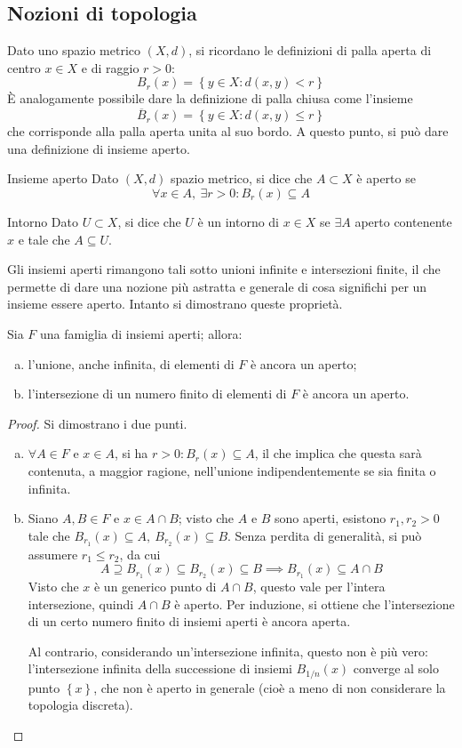 \documentclass[11pt, a4paper]{scrartcl}
\theoremstyle{definition}
\numberwithin{esempio}{section}
\theoremstyle{definition}
\numberwithin{obs}{section}
\numberwithin{nota}{section}
\numberwithin{equation}{subsection}
\begin{document}
\subsection{Nozioni di topologia}
Dato uno spazio metrico $(X,d)$, si ricordano le definizioni di palla aperta di centro $x \in X$ e di raggio $r>0$:
\[
B_r(x) = \left\{ y \in X : d(x,y) < r \right\} 
\] 
\`E analogamente possibile dare la definizione di palla chiusa come l'insieme
\[
\overline{B}_r(x) = \left\{ y \in X : d(x,y) \le r \right\} 
\] 
che corrisponde alla palla aperta unita al suo bordo.
A questo punto, si pu\`o dare una definizione di insieme aperto.
\begin{definizione}
	{Insieme aperto}{}
	Dato $(X,d)$ spazio metrico, si dice che $A  \subset X$ \`e aperto se 
	\[
	\forall x \in A, \ \exists r > 0 : B_r (x) \subseteq A
	\] 
\end{definizione}
\begin{definizione}
	{Intorno}{}
	Dato $U \subset X$, si dice che $U$ \`e un intorno di $x \in X$ se $\exists A$ aperto contenente $x$ e tale che $A \subseteq U$.
\end{definizione}
\noindent Gli insiemi aperti rimangono tali sotto unioni infinite e intersezioni finite, il che permette di dare una nozione pi\`u astratta e generale di cosa significhi per un insieme essere aperto. 
Intanto si dimostrano queste propriet\`a.
\begin{prop}
	{}{}
	Sia $F$ una famiglia di insiemi aperti; allora:
	\begin{enumerate}[(a).]
		\item l'unione, anche infinita, di elementi di $F$ \`e ancora un aperto;
		\item l'intersezione di un numero finito di elementi di $F$ \`e ancora un aperto.
	\end{enumerate}
	\begin{proof}
		Si dimostrano i due punti.
		\begin{enumerate}[(a).]
			\item $\forall A \in F$ e $x \in A$, si ha $r>0:B_r(x) \subseteq A$, il che implica che questa sar\`a contenuta, a maggior ragione, nell'unione indipendentemente se sia finita o infinita. 
			\item Siano $A,B \in F$ e $x \in A \cap B$; visto che $A$ e $B$ sono aperti, esistono $r_1,r_2>0$ tale che $B_{r_1} (x) \subseteq A , \ B_{r_2} (x) \subseteq B$. 
				Senza perdita di generalit\`a, si pu\`o assumere $r_1\le r_2$, da cui 
				\[
				A \supseteq B_{r_1} (x) \subseteq B_{r_2} (x) \subseteq B\implies B_{r_1} (x) \subseteq A\cap B
				\] 
				Visto che $x$ \`e un generico punto di $A \cap B$, questo vale per l'intera intersezione, quindi $A \cap B$ \`e aperto.
				Per induzione, si ottiene che l'intersezione di un certo numero finito di insiemi aperti \`e ancora aperta.

				Al contrario, considerando un'intersezione infinita, questo non \`e pi\`u vero: l'intersezione infinita della successione di insiemi $B_{1 / n} (x)$ converge al solo punto $\left\{ x \right\} $, che non \`e aperto in generale (cio\`e a meno di non considerare la topologia discreta).
		\end{enumerate}
	\end{proof}
\end{prop}
\end{document}
